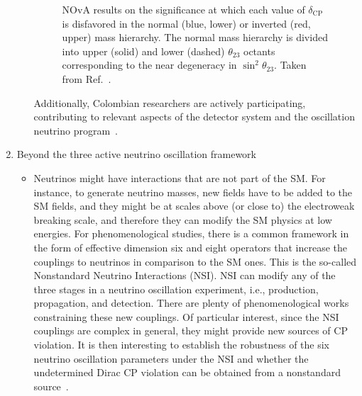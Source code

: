 \documentclass[a4paper,11pt]{article}
\begin{document}
\begin{enumerate}
\begin{itemize}
\begin{figure}
	    \caption{NOvA results on the significance at which each value of $\delta_\text{CP}$ is disfavored in the normal (blue, lower) or inverted (red, upper) mass hierarchy. The normal mass hierarchy is divided into upper (solid) and lower (dashed) $\theta_{23}$ octants corresponding to the near degeneracy in $\sin^2\theta_{23}$.  Taken from Ref.~\cite{NOvA:2018gge}.}
    	\label{fig:nova}
        \end{figure} 
        Additionally, Colombian researchers are actively participating, contributing to relevant aspects of the detector system and the oscillation neutrino program~\cite{Abi:2020wmh, Abi:2020evt, Abi:2020qib}.
    \end{itemize}
    \item Beyond the three active neutrino oscillation framework
    \begin{itemize}
        \item Neutrinos might have interactions that are not part of the SM. For instance, to generate neutrino masses, new fields have to be added to the SM fields, and they might be at scales above (or close to) the electroweak breaking scale, and therefore they can modify the SM physics at low energies. For phenomenological studies, there is a common framework in the form of effective dimension six and eight operators that increase the couplings to neutrinos in comparison to the SM ones. This is the so-called Nonstandard Neutrino Interactions (NSI). NSI can modify any of the three stages in a neutrino oscillation experiment, i.e., production, propagation, and detection. There are plenty of phenomenological works constraining these new couplings. Of particular interest, since the NSI couplings are complex in general, they might provide new sources of CP violation. It is then interesting to establish the robustness of the six neutrino oscillation parameters under the NSI and whether the undetermined Dirac CP violation can be obtained from a nonstandard source~\cite{Forero:2016cmb}.
    \begin{figure}

\end{figure}
\end{itemize}
\end{enumerate}
\end{document}
